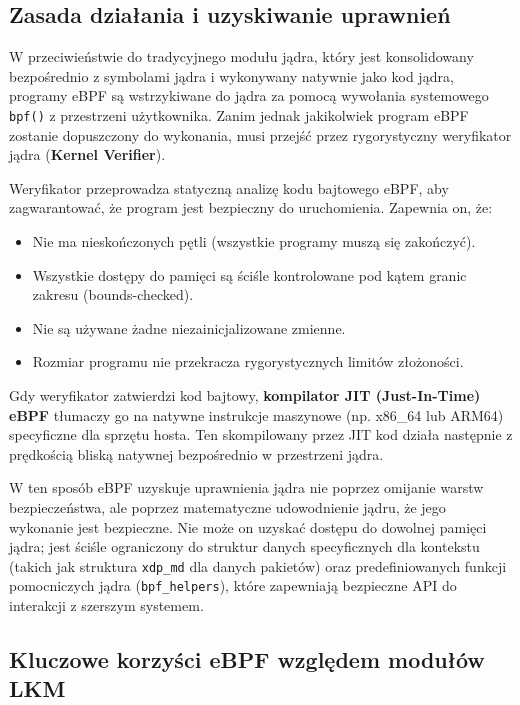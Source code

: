 \documentclass[11pt,a4paper]{article}
\begin{document}
\subsection{Zasada działania i uzyskiwanie uprawnień}

W przeciwieństwie do tradycyjnego modułu jądra, który jest konsolidowany bezpośrednio z symbolami jądra i wykonywany natywnie jako kod jądra, programy eBPF są wstrzykiwane do jądra za pomocą wywołania systemowego \texttt{bpf()} z przestrzeni użytkownika. Zanim jednak jakikolwiek program eBPF zostanie dopuszczony do wykonania, musi przejść przez rygorystyczny weryfikator jądra (\textbf{Kernel Verifier}). 

Weryfikator przeprowadza statyczną analizę kodu bajtowego eBPF, aby zagwarantować, że program jest bezpieczny do uruchomienia. Zapewnia on, że:
\begin{itemize}
    \item Nie ma nieskończonych pętli (wszystkie programy muszą się zakończyć).
    \item Wszystkie dostępy do pamięci są ściśle kontrolowane pod kątem granic zakresu (bounds-checked).
    \item Nie są używane żadne niezainicjalizowane zmienne.
    \item Rozmiar programu nie przekracza rygorystycznych limitów złożoności.
\end{itemize}

Gdy weryfikator zatwierdzi kod bajtowy, \textbf{kompilator JIT (Just-In-Time) eBPF} tłumaczy go na natywne instrukcje maszynowe (np. x86\_64 lub ARM64) specyficzne dla sprzętu hosta. Ten skompilowany przez JIT kod działa następnie z prędkością bliską natywnej bezpośrednio w przestrzeni jądra.

W ten sposób eBPF uzyskuje uprawnienia jądra nie poprzez omijanie warstw bezpieczeństwa, ale poprzez matematyczne udowodnienie jądru, że jego wykonanie jest bezpieczne. Nie może on uzyskać dostępu do dowolnej pamięci jądra; jest ściśle ograniczony do struktur danych specyficznych dla kontekstu (takich jak struktura \texttt{xdp\_md} dla danych pakietów) oraz predefiniowanych funkcji pomocniczych jądra (\texttt{bpf\_helpers}), które zapewniają bezpieczne API do interakcji z szerszym systemem.

\subsection{Kluczowe korzyści eBPF względem modułów LKM}
\end{document}
